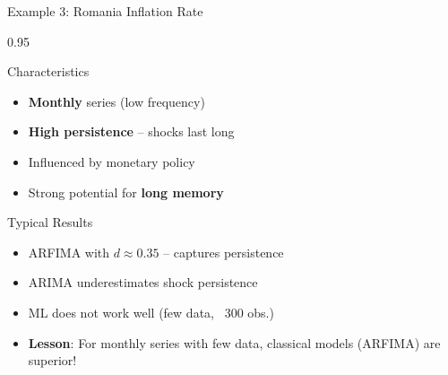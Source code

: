 \documentclass[9pt, aspectratio=169, t]{beamer}
\begin{document}
\begin{frame}{Example 3: Romania Inflation Rate}
    \begin{cminipage}{0.95\textwidth}
    \begin{block}{Characteristics}
        \begin{itemize}\setlength{\itemsep}{0pt}
            \item \textbf{Monthly} series (low frequency)
            \item \textbf{High persistence} -- shocks last long
            \item Influenced by monetary policy
            \item Strong potential for \textbf{long memory}
        \end{itemize}
    \end{block}

    \vspace{0.1cm}

    \begin{alertblock}{Typical Results}
        \begin{itemize}\setlength{\itemsep}{0pt}
            \item ARFIMA with $d \approx 0.35$ -- captures persistence
            \item ARIMA underestimates shock persistence
            \item ML does not work well (few data, ~300 obs.)
        \end{itemize}
    \end{alertblock}

    \vspace{0.2cm}

    {\footnotesize
    \begin{exampleblock}{}
        \begin{itemize}\setlength{\itemsep}{0pt}
            \item \textbf{Lesson}: For monthly series with few data, classical models (ARFIMA) are superior!
        \end{itemize}
    \end{exampleblock}
    }
    \end{cminipage}
\end{frame}
\end{document}
